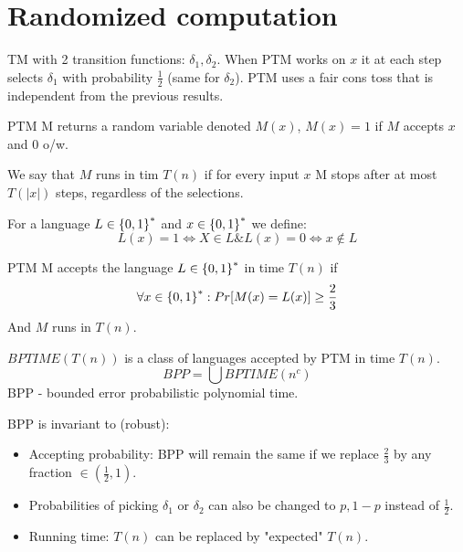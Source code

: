 \section{\texorpdfstring{Randomized computation}{Randomized computation}}
\vspace{5mm}
\large


\begin{definition}
	TM with 2 transition functions: $\delta_1, \delta_2$.
	When PTM works on $x$ it at each step selects $\delta_1$ with probability $\frac{1}{2}$ (same for $\delta_2$).
	PTM uses a fair cons toss that is independent from the previous results.

	PTM M returns a random variable denoted $M(x)$, $M(x) = 1$ if $M$ accepts $x$ and $0$ o/w.

	We say that $M$ runs in tim $T(n)$ if for every input $x$ M stops after at most $T(|x|)$ steps, regardless of the selections.
\end{definition}

\begin{notation}
	For a language $L \in \operatorname{\{ 0, 1 \}}^{\ast}$ and $x \in \operatorname{\{ 0, 1 \}}^{\ast}$ we define:
	\[ L(x) = 1 \iff X \in L \& L(x) = 0 \iff x \notin L \]
\end{notation}

\begin{definition}[BPP]
	PTM M accepts the language $L \in \operatorname{\{ 0, 1 \}}^{\ast}$ in time $T(n)$ if
	\[ \forall x \in \operatorname{\{ 0, 1 \}}^{\ast}: Pr[M(x) = L(x)] \geq \frac{2}{3} \]
	And $M$ runs in $T(n)$.

	$BPTIME(T(n))$ is a class of languages accepted by PTM in time $T(n)$.
	\[ BPP = \bigcup BPTIME(n^c) \]
	BPP - bounded error probabilistic polynomial time.
\end{definition}

\begin{properties}[BPP]
	BPP is invariant to (robust):
	\begin{itemize}
		\item Accepting probability: BPP will remain the same if we replace $\frac{2}{3}$ by any fraction $\in (\frac{1}{2}, 1)$.

		\item Probabilities of picking $\delta_1$ or $\delta_2$ can also be changed to $p, 1 - p$ instead of $\frac{1}{2}$.
		\item Running time: $T(n)$ can be replaced by "expected" $T(n)$.
	\end{itemize}
\end{properties}


